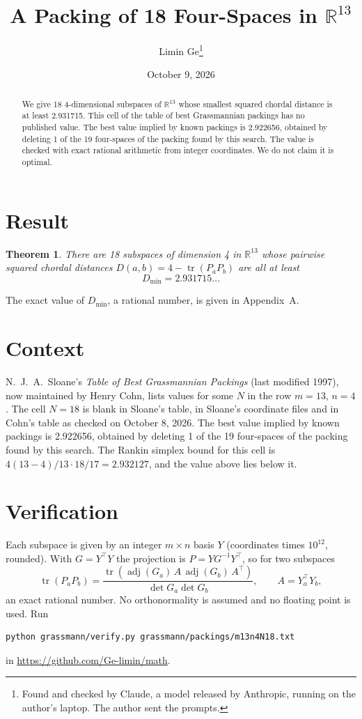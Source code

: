 \documentclass[11pt,a4paper]{article}
\title{A Packing of 18 Four-Spaces in $\mathbb{R}^{13}$}
\author{Limin Ge\thanks{Found and checked by Claude, a model released by Anthropic, running on the author's laptop. The author sent the prompts.}}
\date{October 9, 2026}
\newtheorem*{theorem}{Theorem}
\begin{document}
\maketitle
\begin{abstract}
We give 18 4-dimensional subspaces of $\mathbb{R}^{13}$ whose smallest squared chordal distance is at least 2.931715. This cell of the table of best Grassmannian packings has no published value. The best value implied by known packings is 2.922656, obtained by deleting 1 of the 19 four-spaces of the packing found by this search. The value is checked with exact rational arithmetic from integer coordinates. We do not claim it is optimal.
\end{abstract}

\section{Result}
\begin{theorem}
There are 18 subspaces of dimension 4 in $\mathbb{R}^{13}$ whose pairwise squared chordal distances $D(a,b) = 4 - \operatorname{tr}(P_aP_b)$ are all at least
\[ D_{\min} = 2.931715\ldots \]
\end{theorem}
The exact value of $D_{\min}$, a rational number, is given in Appendix~A.


\section{Context}
N.~J.~A.~Sloane's \emph{Table of Best Grassmannian Packings} (last modified 1997), now maintained by Henry Cohn, lists values for some $N$ in the row $m=13$, $n=4$. The cell $N=18$ is blank in Sloane's table, in Sloane's coordinate files and in Cohn's table as checked on October 8, 2026. The best value implied by known packings is 2.922656, obtained by deleting 1 of the 19 four-spaces of the packing found by this search. The Rankin simplex bound for this cell is $4(13-4)/13\cdot 18/17 = 2.932127$, and the value above lies below it.


\section{Verification}
Each subspace is given by an integer $m\times n$ basis $Y$ (coordinates times $10^{12}$, rounded). With $G=Y^\top Y$ the projection is $P=YG^{-1}Y^\top$, so for two subspaces
\[ \operatorname{tr}(P_aP_b)=\frac{\operatorname{tr}(\operatorname{adj}(G_a)\,A\,\operatorname{adj}(G_b)\,A^\top)}{\det G_a\det G_b},\qquad A=Y_a^\top Y_b, \]
an exact rational number. No orthonormality is assumed and no floating point is used. Run
\begin{verbatim}
python grassmann/verify.py grassmann/packings/m13n4N18.txt
\end{verbatim}
in \url{https://github.com/Ge-limin/math}.
\end{document}
